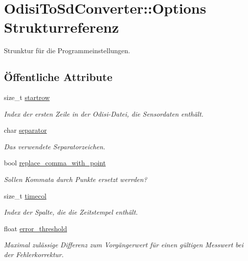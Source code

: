 \hypertarget{structOdisiToSdConverter_1_1Options}{\section{Odisi\-To\-Sd\-Converter\-:\-:Options Strukturreferenz}
\label{structOdisiToSdConverter_1_1Options}
}


Strunktur für die Programmeinstellungen.  


\subsection*{Öffentliche Attribute}
\begin{DoxyCompactItemize}
\item 
size\-\_\-t \hyperlink{structOdisiToSdConverter_1_1Options_acb8ca8c36555d0fa3d1b87e2c8800fe6}{startrow}
\begin{DoxyCompactList}\small\item\em Index der ersten Zeile in der Odisi-\/\-Datei, die Sensordaten enthält. \end{DoxyCompactList}\item 
char \hyperlink{structOdisiToSdConverter_1_1Options_ae4c74d1fdfbaf37eb4b38f4b684cfa31}{separator}
\begin{DoxyCompactList}\small\item\em Das verwendete Separatorzeichen. \end{DoxyCompactList}\item 
bool \hyperlink{structOdisiToSdConverter_1_1Options_ad5adb03bbad593944fb94802f9efffe1}{replace\-\_\-comma\-\_\-with\-\_\-point}
\begin{DoxyCompactList}\small\item\em Sollen Kommata durch Punkte ersetzt werrden? \end{DoxyCompactList}\item 
size\-\_\-t \hyperlink{structOdisiToSdConverter_1_1Options_a43e744e0769d2b436c56ee6a9e410613}{timecol}
\begin{DoxyCompactList}\small\item\em Index der Spalte, die die Zeitstempel enthält. \end{DoxyCompactList}\item 
float \hyperlink{structOdisiToSdConverter_1_1Options_a2d540b0bd36d458de7797792efb13f13}{error\-\_\-threshold}
\begin{DoxyCompactList}\small\item\em Maximal zulässige Differenz zum Vorgängerwert für einen gültigen Messwert bei der Fehlerkorrektur. \end{DoxyCompactList}\item 

\end{DoxyCompactItemize}
